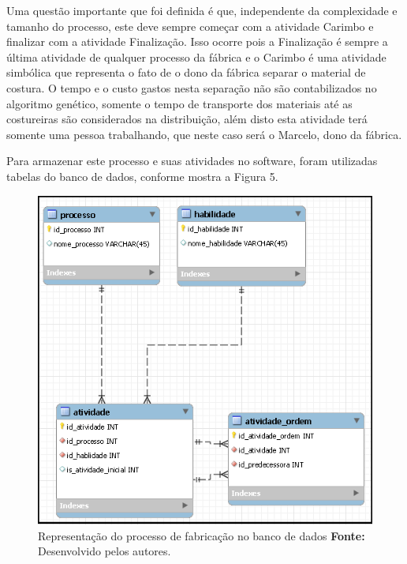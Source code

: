 \par  Uma questão importante que foi definida é que, independente da complexidade e tamanho do processo, este deve sempre começar 
com a atividade Carimbo e finalizar com a atividade Finalização. Isso ocorre pois a Finalização é sempre a última atividade 
de qualquer processo da fábrica e o Carimbo é uma atividade simbólica que representa o fato de o dono da fábrica separar o 
material de costura. O tempo e o custo gastos nesta separação não são contabilizados no algoritmo genético, somente o tempo de 
transporte dos materiais até as costureiras são considerados na distribuição, além disto esta atividade terá somente uma pessoa
trabalhando, que neste caso será o Marcelo, dono da fábrica.

\par Para armazenar este processo e suas atividades no software, foram utilizadas tabelas do banco de dados, conforme mostra 
a Figura 5.

\newpage

\begin{figure}[h!]
	\centerline{\includegraphics[scale=0.7]{./imagens/representacao_processo.png}}
	\caption[Representação do processo de fabricação no banco de dados]
	{Representação do processo de fabricação no banco de dados \textbf{Fonte:}
	Desenvolvido pelos autores.}
	\label{fig:exemplo1}
\end{figure}

